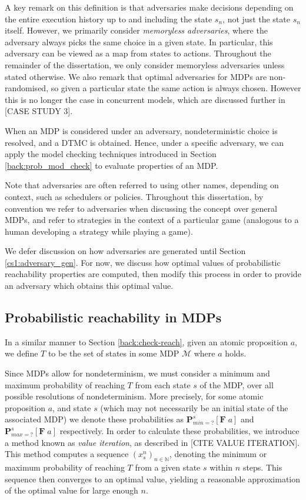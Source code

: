 A key remark on this definition is that adversaries make decisions depending on the entire execution history up to and including the state $s_n$, not just the state $s_n$ itself. However, we primarily consider \emph{memoryless adversaries}, where the adversary always picks the same choice in a given state. In particular, this adversary can be viewed as a map from states to actions.  Throughout the remainder of the dissertation, we only consider memoryless adversaries unless stated otherwise. We also remark that optimal adversaries for MDPs are non-randomised, so given a particular state the same action is always chosen. However this is no longer the case in concurrent models, which are discussed further in [CASE STUDY 3].

When an MDP is considered under an adversary, nondeterministic choice is resolved, and a DTMC is obtained. Hence, under a specific adversary, we can apply the model checking techniques introduced in Section \ref{back:prob_mod_check} to evaluate properties of an MDP.

Note that adversaries are often referred to using other names, depending on context, such as schedulers or policies. Throughout this dissertation, by convention we refer to adversaries when discussing the concept over general MDPs, and refer to strategies in the context of a particular game (analogous to a human developing a strategy while playing a game).

We defer discussion on how adversaries are generated until Section \ref{cs1:adversary_gen}. For now, we discuss how optimal values of probabilistic reachability properties are computed, then modify this process in order to provide an adversary which obtains this optimal value.

\subsection{Probabilistic reachability in MDPs}
\label{cs1:prob_reach_mdps}

In a similar manner to Section \ref{back:check-reach}, given an atomic proposition $a$, we define $T$ to be the set of states in some MDP $\mathcal{M}$ where $a$ holds.

Since MDPs allow for nondeterminism, we must consider a minimum and maximum probability of reaching $T$ from each state $s$ of the MDP, over all possible resolutions of nondeterminism. More precisely, for some atomic proposition $a$, and state $s$ (which may not necessarily be an initial state of the associated MDP) we denote these probabilities as $\mathbf{P}^{s}_{min=?} [\mathbf{F} \; a]$ and $\mathbf{P}^{s}_{max=?} [\mathbf{F} \; a]$ respectively. In order to calculate these probabilities, we introduce a method known as \emph{value iteration}, as described in [CITE VALUE ITERATION]. This method computes a sequence $(x^n_s)_{n \in \mathbb{N}}$, denoting the minimum or maximum probability of reaching $T$ from a given state $s$ within $n$ steps. This sequence then converges to an optimal value, yielding a reasonable approximation of the optimal value for large enough $n$.

